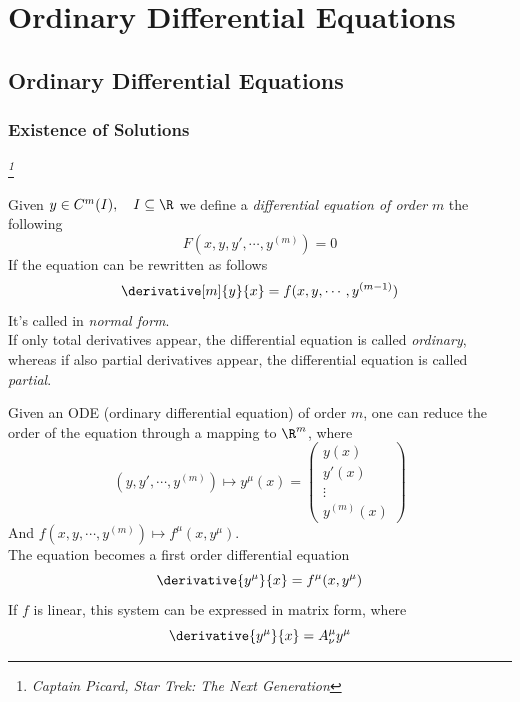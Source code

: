 \documentclass[../mmf.tex]{subfiles}
\begin{document}
\chapter{Ordinary Differential Equations}
\section{Ordinary Differential Equations}
\subsection{Existence of Solutions}
\textit{\footnote{\textit{Captain Picard, Star Trek: The Next Generation}}}
\baselineskip
\begin{dfn}
	Given $y\in C^m(I),\quad I\subseteq\R$ we define a \textit{differential equation of order} $m$ the following
	\begin{equation*}
		F(x,y,y',\cdots,y^{(m)})=0
	\end{equation*}
	If the equation can be rewritten as follows
	\begin{equation*}
		\derivative[m]{y}{x}=f(x,y,\cdots,y^{(m-1)})
	\end{equation*}
	It's called in \textit{normal form}.\\
	If only total derivatives appear, the differential equation is called \textit{ordinary}, whereas if also partial derivatives appear, the differential equation is called \textit{partial}.\\
\end{dfn}
\begin{thm}
	Given an ODE (ordinary differential equation) of order $m$, one can reduce the order of the equation through a mapping to $\R^m$, where
	\begin{equation*}
		(y,y',\cdots,y^{(m)})\mapsto y^\mu(x)=\begin{pmatrix}y(x)\\y'(x)\\\vdots\\y^{(m)}(x)\end{pmatrix}
	\end{equation*}
	And $f(x,y,\cdots,y^{(m)})\mapsto f^\mu(x,y^\mu)$.\\
	The equation becomes a first order differential equation
	\begin{equation*}
		\derivative{y^\mu}{x}=f^\mu(x,y^\mu)
	\end{equation*}
	If $f$ is linear, this system can be expressed in matrix form, where
	\begin{equation*}
		\derivative{y^\mu}{x}=A^\mu_\nu y^\mu
	\end{equation*}
\end{thm}
\end{document}
